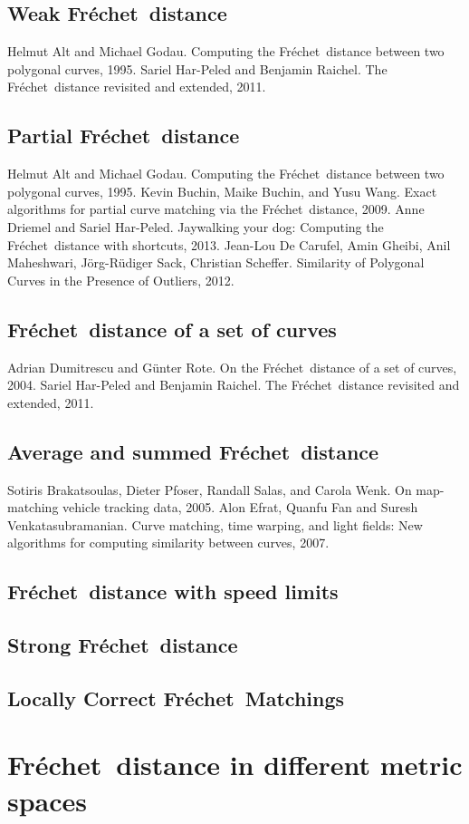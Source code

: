 \documentclass[a4paper,onecolumn]{article}
\numberwithin{equation}{section}
\numberwithin{figure}{section}
\numberwithin{algorithm}{section}
\theoremstyle{plain}
\theoremstyle{definition}
\theoremstyle{remark}
\newcommand{\frechet}{Fr\'echet}
\begin{document}
\subsection{Weak \frechet\ distance}
Helmut Alt and Michael Godau. Computing the \frechet\ distance between two polygonal curves, 1995.
Sariel Har-Peled and Benjamin Raichel. The \frechet\ distance revisited and extended, 2011.
\subsection{Partial \frechet\ distance}
Helmut Alt and Michael Godau. Computing the \frechet\ distance between two polygonal curves, 1995.
Kevin Buchin, Maike Buchin, and Yusu Wang. Exact algorithms for partial curve matching via the \frechet\ distance, 2009.
Anne Driemel and Sariel Har-Peled. Jaywalking your dog: Computing the \frechet\ distance with shortcuts, 2013.
Jean-Lou De Carufel, Amin Gheibi, Anil Maheshwari, J\"org-Rüdiger Sack, Christian Scheffer. Similarity of Polygonal Curves in the Presence of Outliers, 2012.
\subsection{\frechet\ distance of a set of curves}
Adrian Dumitrescu and G\"unter Rote. On the \frechet\ distance of a set of curves, 2004.
Sariel Har-Peled and Benjamin Raichel. The \frechet\ distance revisited and extended, 2011.
\subsection{Average and summed \frechet\ distance}
Sotiris Brakatsoulas, Dieter Pfoser, Randall Salas, and Carola Wenk. On map-matching vehicle tracking data, 2005.
Alon Efrat, Quanfu Fan and Suresh Venkatasubramanian. Curve matching, time warping, and light fields: New algorithms for computing similarity between curves, 2007.
\subsection{\frechet\ distance with speed limits}
\subsection{Strong \frechet\ distance}
\subsection{Locally Correct \frechet\ Matchings}
\section{\frechet\ distance in different metric spaces}
\end{document}
